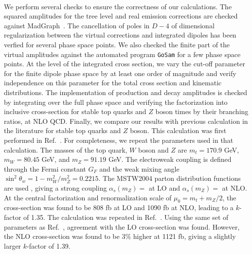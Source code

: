 \documentclass[preprint]{JHEP3} %
\begin{document}
\\
We perform several checks to ensure the correctness of our calculations. 
The squared amplitudes for the tree level and real emission corrections are checked against MadGraph~\cite{Alwall:2011uj}. 
The cancellation of poles in $D-4$ of dimensional regularization between the virtual corrections and integrated dipoles has been verfied for several phase space points.
We also checked the finite part of the virtual amplitudes against the automated program {\tt GoSam} \cite{Cullen:2011ac} for a few phase space points.  
At the level of the integrated cross section, we vary the cut-off parameter for the finite dipole phase space by at least one order of magnitude and 
verify independence on this parameter for the total cross section and kinematic distributions.
The implementation of production and decay amplitudes is checked by integrating over the full phase space and verifying the factorization into 
inclusive cross-section for stable top quarks and $Z$ boson times by their branching ratios, at NLO QCD.
% 
Finally, we compare our results with previous calculation in the literature for stable top quarks and $Z$ boson.
This calculation was first performed in Ref.~\cite{Lazopoulos:2008de}. 
For completeness, we repeat the parameters used in that calculation. 
The masses of the top quark, $W$ boson and $Z$ are $m_t=170.9$ GeV, $m_W=80.45$ GeV, and $m_Z=91.19$ GeV. 
The electroweak coupling is defined through the Fermi constant $G_F$ and the weak mixing angle $\sin^2\theta_w = 1-m_W^2/m_Z^2 =0.2215$. 
The MSTW2004 parton distribution functions are used \cite{}, giving a strong coupling $\alpha_s(m_Z)=$ at LO and $\alpha_s(m_Z)=$ at NLO. 
At the central factorization and renormalization scale of $\mu_0=m_t+m_Z/2$, the cross-section was found to be 808 fb at LO and 1090 fb at NLO, leading to a $k$-factor of 1.35. 
The calculation was repeated in Ref.~\cite{Kardos:2011na}.  
Using the same set of parameters as Ref.~\cite{Lazopoulos:2008de}, agreement with the LO cross-section was found. 
However, the NLO cross-section was found to be 3\% higher at 1121 fb, giving a slightly larger $k$-factor of 1.39. 



\end{document}
